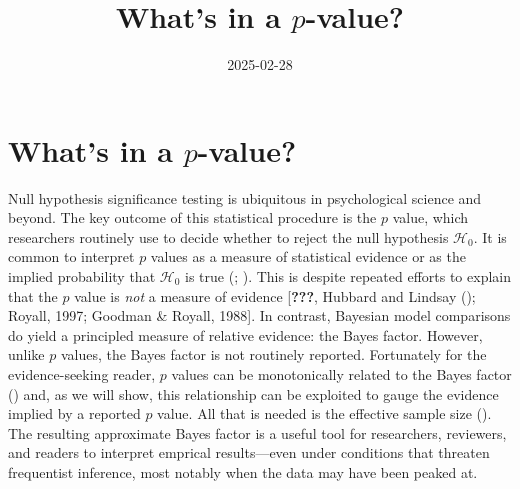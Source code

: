 \documentclass[
  man,
  floatsintext,
  longtable,
  nolmodern,
  notxfonts,
  notimes,
  colorlinks=true,linkcolor=blue,citecolor=blue,urlcolor=blue]{apa7}
\title{What's in a \(p\)-value?}
\date{2025-02-28}
\begin{document}
\maketitle

\hypertarget{toc}{}
\tableofcontents
\newpage
\section[Introduction]{What's in a \(p\)-value?}

\setcounter{secnumdepth}{5}

\setlength\LTleft{0pt}


Null hypothesis significance testing is ubiquitous in psychological
science and beyond. The key outcome of this statistical procedure is the
\(p\) value, which researchers routinely use to decide whether to reject
the null hypothesis \(\mathcal{H}_0\). It is common to interpret \(p\)
values as a measure of statistical evidence or as the implied
probability that \(\mathcal{H}_0\) is true
(;
). This is despite
repeated efforts to explain that the \(p\) value is \emph{not} a measure
of evidence {[}\textbf{???}, Hubbard and Lindsay
(); Royall, 1997; Goodman \& Royall,
1988{]}. In contrast, Bayesian model comparisons do yield a principled
measure of relative evidence: the Bayes factor. However, unlike \(p\)
values, the Bayes factor is not routinely reported. Fortunately for the
evidence-seeking reader, \(p\) values can be monotonically related to
the Bayes factor ()
and, as we will show, this relationship can be exploited to gauge the
evidence implied by a reported \(p\) value. All that is needed is the
effective sample size (). The resulting approximate Bayes factor is a useful tool for
researchers, reviewers, and readers to interpret emprical results---even
under conditions that threaten frequentist inference, most notably when
the data may have been peaked at.
\end{document}
